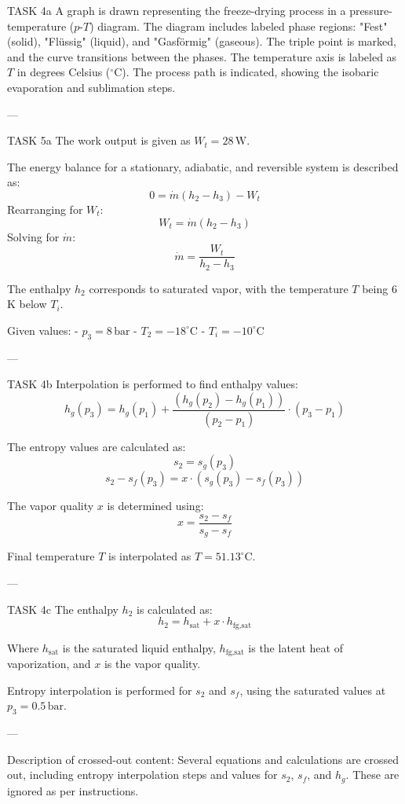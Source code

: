 TASK 4a  
A graph is drawn representing the freeze-drying process in a pressure-temperature (\(p\)-\(T\)) diagram. The diagram includes labeled phase regions: "Fest" (solid), "Flüssig" (liquid), and "Gasförmig" (gaseous). The triple point is marked, and the curve transitions between the phases. The temperature axis is labeled as \( T \) in degrees Celsius (\( ^\circ\text{C} \)). The process path is indicated, showing the isobaric evaporation and sublimation steps.

---

TASK 5a  
The work output is given as \( W_t = 28 \, \text{W} \).  

The energy balance for a stationary, adiabatic, and reversible system is described as:  
\[
0 = \dot{m} (h_2 - h_3) - W_t
\]  
Rearranging for \( W_t \):  
\[
W_t = \dot{m} (h_2 - h_3)
\]  
Solving for \( \dot{m} \):  
\[
\dot{m} = \frac{W_t}{h_2 - h_3}
\]  

The enthalpy \( h_2 \) corresponds to saturated vapor, with the temperature \( T \) being 6 K below \( T_i \).  

Given values:  
- \( p_3 = 8 \, \text{bar} \)  
- \( T_2 = -18^\circ\text{C} \)  
- \( T_i = -10^\circ\text{C} \)  

---

TASK 4b  
Interpolation is performed to find enthalpy values:  
\[
h_g(p_3) = h_g(p_1) + \frac{(h_g(p_2) - h_g(p_1))}{(p_2 - p_1)} \cdot (p_3 - p_1)
\]  

The entropy values are calculated as:  
\[
s_2 = s_g(p_3)  
\]  
\[
s_2 - s_f(p_3) = x \cdot (s_g(p_3) - s_f(p_3))
\]  

The vapor quality \( x \) is determined using:  
\[
x = \frac{s_2 - s_f}{s_g - s_f}
\]  

Final temperature \( T \) is interpolated as \( T = 51.13^\circ\text{C} \).  

---

TASK 4c  
The enthalpy \( h_2 \) is calculated as:  
\[
h_2 = h_{\text{sat}} + x \cdot h_{\text{fg,sat}}
\]  

Where \( h_{\text{sat}} \) is the saturated liquid enthalpy, \( h_{\text{fg,sat}} \) is the latent heat of vaporization, and \( x \) is the vapor quality.  

Entropy interpolation is performed for \( s_2 \) and \( s_f \), using the saturated values at \( p_3 = 0.5 \, \text{bar} \).  

---

Description of crossed-out content:  
Several equations and calculations are crossed out, including entropy interpolation steps and values for \( s_2 \), \( s_f \), and \( h_g \). These are ignored as per instructions.